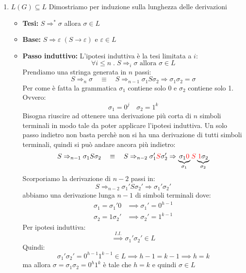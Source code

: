 \documentclass[a4paper]{article}
\begin{document}
\begin{example}
\begin{enumerate}
    \item \( L(G) \subseteq L \) Dimostriamo per induzione sulla lunghezza delle derivazioni
      \begin{itemize}
        \item \textbf{Tesi:} \( S \Rightarrow^* \sigma  \) allora \( \sigma  \in L \) 
        \item \textbf{Base:} \( S \Rightarrow \varepsilon \; (S \to \varepsilon ) \) e
          \( \varepsilon \in L \) 
        \item \textbf{Passo induttivo:} L'ipotesi induttiva è la tesi limitata a \( i \):
          \[
            \forall i \le n \;.\; S \Rightarrow_i \sigma \text{ allora } \sigma \in L
          \] 
          Prendiamo una stringa generata in \( n \) passi:
          \[
            S \Rightarrow_n \sigma \quad\equiv\quad S \Rightarrow_{n-1} \sigma_1 S \sigma_2
            \Rightarrow \sigma_1 \sigma_2 = \sigma
          \] 
          Per come è fatta la grammatica \( \sigma_1 \) contiene solo 0 e \( \sigma_2 \)
          contiene solo 1. Ovvero:
          \[
            \sigma_1 = 0^j \quad \sigma_2 = 1^k
          \] 
          Bisogna riuscire ad ottenere una derivazione più corta di \( n \) simboli terminali
          in modo tale da poter applicare l'ipotesi induttiva. Un solo passo indietro
          non basta perchè non si ha una derivazione di tutti simboli terminali, quindi
          si può andare ancora più indietro:
          \[
            S \Rightarrow_{n-1} \sigma_1 S \sigma_2 \quad\equiv\quad
            S \Rightarrow_{n-2} \sigma_1' \color{red}S\color{black} \sigma_2'
            \Rightarrow \underbrace{\sigma_1
            \color{red}0\color{black}}_{\sigma_1} \color{red}S\color{black}
            \underbrace{\color{red}1\color{black} \sigma_2}_{\sigma_2}
          \] 
          Scorporiamo la derivazione di \( n-2 \) passi in:
          \[
            S \Rightarrow_{n-2} \sigma_1' S \sigma_2' \Rightarrow \sigma_1' \sigma_2'
          \] 
          abbiamo una derivazione lunga \( n-1 \) di simboli terminali dove:
          \[
          \begin{aligned}
            \sigma_1 = \sigma_1' 0 &\implies \sigma_1' = 0^{h-1}\\
            \sigma_2 = 1 \sigma_2' &\implies \sigma_2' = 1^{k-1}
          \end{aligned}
          \] 
          Per ipotesi induttiva:
          \[
            \stackrel{I.I.}{\implies} \sigma_1' \sigma_2' \in L
          \] 
          Quindi:
          \[
            \sigma_1' \sigma_2' = 0^{h-1} 1^{k-1} \in L \implies h-1 = k-1 \implies h = k
          \] 
          ma allora \( \sigma = \sigma_1 \sigma_2 = 0^h 1^k \) è tale che \( h=k \) 
          e quindi \( \sigma \in L \) 


\end{itemize}
\end{enumerate}
\end{example}
\end{document}
